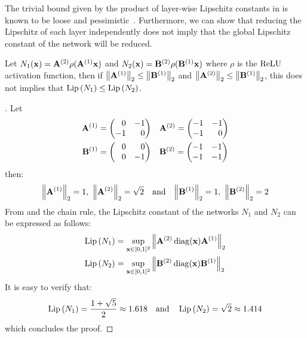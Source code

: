 The trivial bound given by the product of layer-wise Lipschitz constants in  is known to be loose and pessimistic~\citet{combettes2019lipschitz}.
Furthermore, we can show that reducing the Lipschitz of each layer independently does not imply that the global Lipschitz constant of the network will be reduced. 
\begin{proposition}
  Let $N_1(\mathbf{x}) = \mathbf{A}^{(2)} \rho(\mathbf{A}^{(1)} \mathbf{x})$ and $N_2(\mathbf{x}) = \mathbf{B}^{(2)} \rho(\mathbf{B}^{(1)} \mathbf{x})$ where $\rho$ is the $\operatorname{ReLU}$ activation function, then if $\norm{\mathbf{A}^{(1)}}_2 \leq \norm{\mathbf{B}^{(1)}}_2$ and $\norm{\mathbf{A}^{(2)}}_2 \leq \norm{\mathbf{B}^{(1)}}_2$, this does not implies that $\operatorname{Lip}{(N_1)} \leq \operatorname{Lip}{(N_2)}$.
  \label{proposition:ch3-limit_bound_lipschitz}
\end{proposition}
\begin{proof}[]
  Let
  \begin{align*}
    \Amat^{(1)} &= \leftmatrix 
      \phantom{+}0 & -1 \\ -1 & \phantom{+}0
    \rightmatrix \quad
    \Amat^{(2)}  = \leftmatrix
      -1 & -1 \\ -1 & \phantom{+}0
    \rightmatrix \\
    \Bmat^{(1)} &= \leftmatrix
      \phantom{+}0 & \phantom{+}0 \\ \phantom{+}0 & -1
    \rightmatrix \quad
    \Bmat^{(2)} = \leftmatrix
      -1 & -1 \\ -1 & -1
    \rightmatrix
  \end{align*}
  then: \vspace{-0.5cm}
  \begin{equation*}
    \norm{\mathbf{A}^{(1)}}_2 = 1,\ \norm{\mathbf{A}^{(2)}}_2 = \sqrt{2}
    \quad \text{and} \quad
    \norm{\mathbf{B}^{(1)}}_2 = 1,\ \norm{\mathbf{B}^{(2)}}_2 = 2
  \end{equation*}
  From  and the chain rule, the Lipschitz constant of the networks $N_1$ and $N_2$ can be expressed as follows:
  \begin{align*}
    \lip{N_1} &= \sup_{\xvec \in [0, 1]^2} \norm{\Amat^{(2)} \diag\left(\xvec\right) \Amat^{(1)}}_2 \\
    \lip{N_2} &= \sup_{\xvec \in [0, 1]^2} \norm{\Bmat^{(2)} \diag\left(\xvec\right) \Bmat^{(1)}}_2
  \end{align*}
  It is easy to verify that:
  \begin{equation*}
    \operatorname{Lip}{(N_1)} = \frac{1 + \sqrt{5}}{2} \approx 1.618 \quad \text{and} \quad \operatorname{Lip}{(N_2)} = \sqrt{2} \approx 1.414
  \end{equation*}
  which concludes the proof.
\end{proof}

